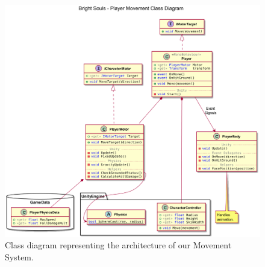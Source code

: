 \begin{figure}[!ht]
    \begin{center}
    \caption{Class diagram representing the architecture of our Movement System.}
    \vspace{0.5em}
        \includegraphics[width=34em]{figures/fig-player-movement-class-diagram.png}
    \end{center}
    \label{fig:movement-class-diagram}
\end{figure}